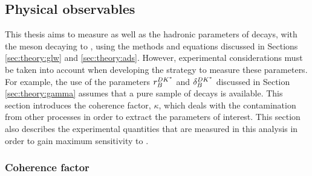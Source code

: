\subsection{Physical observables}

This thesis aims to measure \Pgamma as well as the hadronic parameters of \btodkst decays, with the \Kstarm meson decaying to \KS\pim, using the methods and equations discussed in Sections \ref{sec:theory:glw} and \ref{sec:theory:ads}. However, experimental considerations must be taken into account when developing the strategy to measure these parameters. For example, the use of the parameters $r_B^{DK^*}$ and $\delta_B^{DK^*}$ discussed in Section \ref{sec:theory:gamma} assumes that a pure sample of \btodkst decays is available. This section introduces the \btodkst coherence factor, $\kappa$, which deals with the contamination from other \decay{\Bm}{\D\KS\pim} processes in order to extract the parameters of interest. This section also describes the experimental quantities that are measured in this analysis in order to gain maximum sensitivity to \Pgamma. 

\subsubsection{Coherence factor}
\label{sec:theory:kappa}

